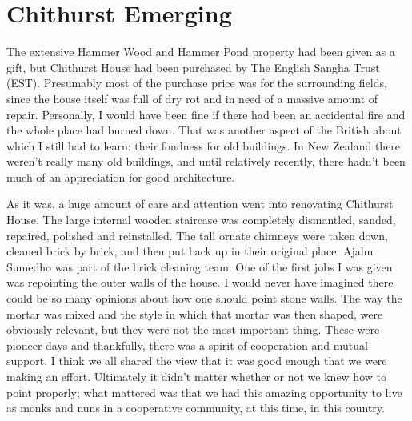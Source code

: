 \chapter{Chithurst Emerging}

The extensive Hammer Wood and Hammer Pond property had been given as a
gift, but Chithurst House had been purchased by The English Sangha Trust
(EST). Presumably most of the purchase price was for the surrounding
fields, since the house itself was full of dry rot and in need of a
massive amount of repair. Personally, I would have been fine if there
had been an accidental fire and the whole place had burned down. That
was another aspect of the British about which I still had to learn:
their fondness for old buildings. In New Zealand there weren't really
many old buildings, and until relatively recently, there hadn't been
much of an appreciation for good architecture.

As it was, a huge amount of care and attention went into renovating
Chithurst House. The large internal wooden staircase was completely
dismantled, sanded, repaired, polished and reinstalled. The tall ornate
chimneys were taken down, cleaned brick by brick, and then put back up
in their original place. Ajahn Sumedho was part of the brick cleaning
team. One of the first jobs I was given was repointing the outer walls
of the house. I would never have imagined there could be so many
opinions about how one should point stone walls. The way the mortar was
mixed and the style in which that mortar was then shaped, were obviously
relevant, but they were not the most important thing. These were pioneer
days and thankfully, there was a spirit of cooperation and mutual
support. I think we all shared the view that it was good enough that we
were making an effort. Ultimately it didn't matter whether or not we
knew how to point properly; what mattered was that we had this amazing
opportunity to live as monks and nuns in a cooperative community, at
this time, in this country.

